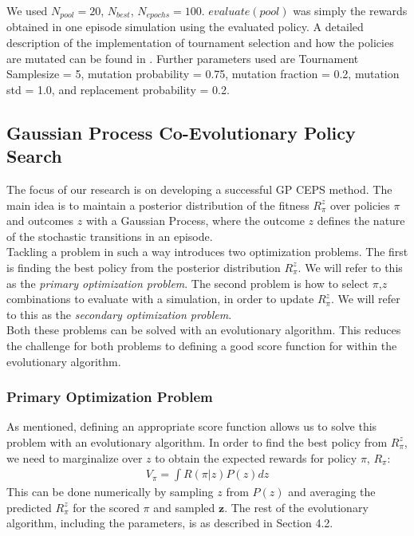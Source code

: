 We used $N_{pool} = 20$, $N_{best}$, $N_{epochs} = 100$. $evaluate(pool)$ was simply the rewards obtained in one episode simulation using the evaluated policy.  
A detailed description of the implementation of tournament selection and how the policies are mutated can be found in \cite{koppejan2011neuroevolutionary}. Further parameters used are Tournament Samplesize = 5, mutation probability = 0.75, mutation fraction = 0.2, mutation std = 1.0, and replacement probability = 0.2. 

\subsection{Gaussian Process Co-Evolutionary Policy Search}

The focus of our research is on developing a successful GP CEPS method. The main idea is to maintain a posterior distribution of the fitness $R_{\pi}^z$ over policies $\pi$ and outcomes $z$ with a Gaussian Process, where the outcome $z$ defines the nature of the stochastic transitions in an episode. \\
Tackling a problem in such a way introduces two optimization problems. The first is finding the best policy from the posterior distribution $R_{\pi}^z$. We will refer to this as the \textit{primary optimization problem}. The second problem is how to select $\pi$,$z$ combinations to evaluate with a simulation, in order to update $R_{\pi}^z$. We will refer to this as the \textit{secondary optimization problem}. \\
Both these problems can be solved with an evolutionary algorithm. This reduces the challenge for both problems to defining a good score function for within the evolutionary algorithm.

\subsubsection{Primary Optimization Problem}

As mentioned, defining an appropriate score function allows us to solve this problem with an evolutionary algorithm. In order to find the best policy from $R_{\pi}^z$, we need to marginalize over $z$ to obtain the expected rewards for policy $\pi$, $R_{\pi}$: 
\begin{align}
V_{\pi} = \int R(\pi | z) P(z)dz 
\end{align}
This can be done numerically by sampling $z$ from $P(z)$ and averaging the predicted $R_{\pi}^z$ for the scored $\pi$ and sampled $\mathbf{z}$. The rest of the evolutionary algorithm, including the parameters, is as described in Section 4.2.


